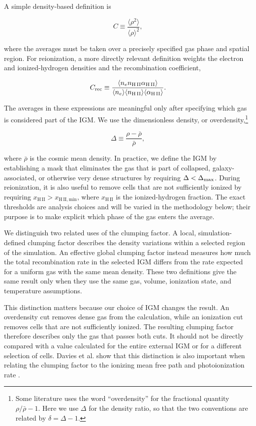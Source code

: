 A simple density-based definition is

$$
C \equiv \frac{\langle \rho^2 \rangle}{\langle \rho \rangle^2},
$$

where the averages must be taken over a precisely specified gas phase and spatial region. For reionization, a more directly relevant definition weights the electron and ionized-hydrogen densities and the recombination coefficient,

$$
C_{\rm rec} \equiv \frac{\left\langle n_e n_{\mathrm{H\,II}} \alpha_{\mathrm{H\,II}} \right\rangle}{\langle n_e\rangle \langle n_{\mathrm{H\,II}}\rangle \langle\alpha_{\mathrm{H\,II}}\rangle}.
$$

The averages in these expressions are meaningful only after specifying which gas is considered part of the IGM. We use the dimensionless density, or overdensity,\footnote{Some literature uses the word ``overdensity'' for the fractional quantity $\rho/\bar\rho-1$. Here we use $\Delta$ for the density ratio, so that the two conventions are related by $\delta=\Delta-1$.}

$$
\Delta \equiv \frac{\rho - \bar\rho}{\bar\rho},
$$

where $\bar\rho$ is the cosmic mean density. In practice, we define the IGM by establishing a mask that eliminates the gas that is part of collapsed, galaxy-associated, or otherwise very dense structures by requiring $\Delta<\Delta_{\rm max}$. During reionization, it is also useful to remove cells that are not sufficiently ionized by requiring $x_{\mathrm{H\,II}}>x_{\mathrm{H\,II,min}}$, where $x_{\mathrm{H\,II}}$ is the ionized-hydrogen fraction. The exact thresholds are analysis choices and will be varied in the methodology below; their purpose is to make explicit which phase of the gas enters the average.

We distinguish two related uses of the clumping factor. A local, simulation-defined clumping factor describes the density variations within a selected region of the simulation. An effective global clumping factor instead measures how much the total recombination rate in the selected IGM differs from the rate expected for a uniform gas with the same mean density. These two definitions give the same result only when they use the same gas, volume, ionization state, and temperature assumptions.

This distinction matters because our choice of IGM changes the result. An overdensity cut removes dense gas from the calculation, while an ionization cut removes cells that are not sufficiently ionized. The resulting clumping factor therefore describes only the gas that passes both cuts. It should not be directly compared with a value calculated for the entire external IGM or for a different selection of cells. Davies et al. show that this distinction is also important when relating the clumping factor to the ionizing mean free path and photoionization rate \cite{davies2024clumping}.

